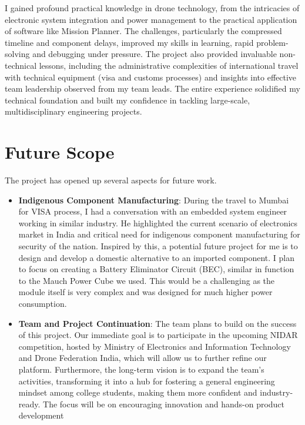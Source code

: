 I gained profound practical knowledge in drone technology, from the intricacies of electronic system integration and power management to the practical application of software like Mission Planner. The challenges, particularly the compressed timeline and component delays, improved my skills in learning, rapid problem-solving and debugging under pressure. The project also provided invaluable non-technical lessons, including the administrative complexities of international travel with technical equipment (visa and customs processes) and insights into effective team leadership observed from my team leads. The entire experience solidified my technical foundation and built my confidence in tackling large-scale, multidisciplinary engineering projects.

\pagebreak
\section{Future Scope}

The project has opened up several aspects for future work.

\begin{itemize}
	\item \textbf{Indigenous Component Manufacturing}:
During the travel to Mumbai for VISA process, I had a conversation with an embedded system engineer working in similar industry. He highlighted the current scenario of electronics market in India and critical need for indigenous component manufacturing for security of the nation. Inspired by this, a potential future project for me is to design and develop a domestic alternative to an imported component. I plan to focus on creating a Battery Eliminator Circuit (BEC), similar in function to the Mauch Power Cube we used. This would be a challenging as the module itself is very complex and was designed for much higher power consumption.

\item \textbf{Team and Project Continuation}:
The team plans to build on the success of this project. Our immediate goal is to participate in the upcoming NIDAR competition, hosted by Ministry of Electronics and Information Technology and Drone Federation India, which will allow us to further refine our platform. Furthermore, the long-term vision is to expand the team's activities, transforming it into a hub for fostering a general engineering mindset among college students, making them more confident and industry-ready. The focus will be on encouraging innovation and hands-on product development
\end{itemize}
